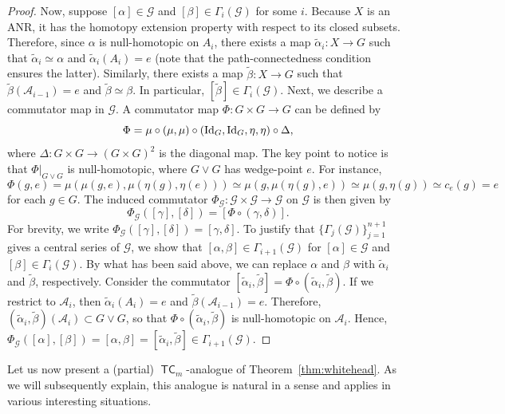 \documentclass[amscd,amssymb,verbatim,10pt]{amsart}
\numberwithin{equation}{section}
\theoremstyle{plain}
\theoremstyle{definition}
\DeclareMathOperator{\TC}{{\mathsf{TC}}}
\def\id{\protect\operatorname{Id}}
\newcommand{\cA}{{\mathcal{A}}}
\newcommand{\cG}{{\mathcal{G}}}
\def\wt{\widetilde}
\begin{document}
\begin{proof}
Now, suppose $[\alpha]\in \cG$ and $[\beta]\in \Gamma_i(\cG)$ for some $i$. Because $X$ is an ANR, it has the homotopy extension property with respect to its closed subsets. Therefore, since $\alpha$ is null-homotopic on $A_i$, there exists a map $\wt \alpha_i\colon X \to G$ such that $\wt \alpha_i\simeq \alpha$ and $\wt \alpha_i(A_i)=e$ (note that the path-connectedness condition ensures the latter). Similarly, there exists a map $\wt \beta\colon X \to G$ such that $\wt\beta (\cA_{i-1})=e$ and $\wt\beta\simeq \beta$. In particular, $[\wt\beta]\in\Gamma_i(\cG)$. Next, we describe a commutator map in $\cG$. A 
commutator map $\Phi\colon G \times G \to G$ can be defined by 
$$\Phi = \mu \circ (\mu, \mu)\circ (\id_G, \id_G, \eta, \eta)\circ \Delta,$$
where $\Delta \colon G\times G \to (G\times G)^2$ is the diagonal map.
The key point to notice is that $\Phi|_{G \vee G}$ is null-homotopic, where $G\vee G$ has wedge-point $e$. For instance,
$$\Phi(g,e) = \mu(\mu(g,e),\mu(\eta(g),\eta(e)))\simeq \mu(g,\mu(\eta(g),e))\simeq \mu(g,\eta(g))\simeq c_e(g)=e$$
for each $g\in G$. The induced commutator $\Phi_{\cG}\colon\cG\times\cG\to\cG$ on $\cG$ is then given by
$$\Phi_{\cG}([\gamma],[\delta]) = [\Phi \circ (\gamma,\delta)].$$
For brevity, we write $\Phi_{\cG}([\gamma],[\delta])
=[\gamma,\delta]$. To justify that $\{\Gamma_j(\cG)\}_{j=1}^{n+1}$ gives a central series of $\cG$, we show that $[\alpha,\beta]\in \Gamma_{i+1}(\cG)$ for $[\alpha]\in \cG$ and $[\beta]\in\Gamma_i(\cG)$. By what has been
said above, we can replace $\alpha$ and $\beta$ with $\wt \alpha_i$ and $\wt\beta$, respectively. 
Consider the commutator $[\wt \alpha_i,\wt \beta] = \Phi \circ (\wt \alpha_i, \wt \beta)$. If we
restrict to $\cA_i$, then $\wt\alpha_i(A_i)=e$ and $\wt\beta(\cA_{i-1})=e$. Therefore, $(\wt\alpha_i,\wt\beta)(\cA_i)\subset G\vee G$, so that $\Phi \circ (\wt \alpha_i, \wt \beta)$ is null-homotopic on $\cA_i$. Hence, $\Phi_{\cG}([\alpha],[\beta])=[\alpha,\beta]=[\wt \alpha_i,\wt \beta]\in\Gamma_{i+1}(\cG)$. 
\end{proof}

Let us now present a (partial) $\TC_m$-analogue of Theorem~\ref{thm:whitehead}. As we will subsequently explain, this analogue is natural in a sense and applies in various interesting situations.
\end{document}
